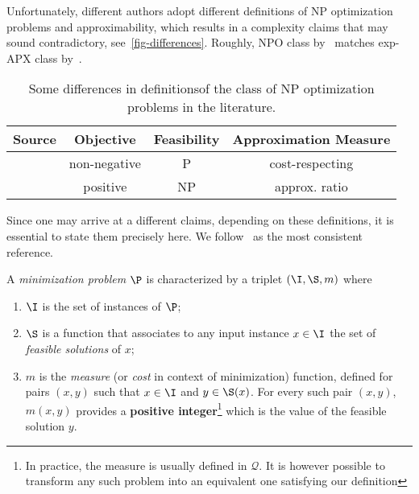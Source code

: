 Unfortunately, different authors adopt different definitions of NP optimization problems and approximability, which results in a complexity claims that may sound contradictory, see~\autoref{fig-differences}. Roughly, NPO class by~\citet{Orponen90onapproximation} matches exp-APX class by~\citet{approx99}.
\begin{table}[tb]
\centering
\setlength{\tabcolsep}{2pt}
\begin{tabular}{|c|ccc|}
\hline
Source & Objective & Feasibility & Approximation Measure \\
\hline
\cite{Orponen90onapproximation} & non-negative & P &  cost-respecting\\
\cite{approx99} & positive & NP &  approx. ratio\\
\hline
\end{tabular}
\caption{Some differences in definitions\label{fig-differences} of the class of NP optimization problems in the literature.}
\end{table}
Since one may arrive at a different claims, depending on these definitions, it is essential to state them precisely here. We follow~\citet{approx99} as the most consistent reference.
%
\begin{definition}A {\em minimization problem} $\P$ is characterized by a triplet $(\I,\S,m)$ where
\begin{enumerate}
\item $\I$ is the set of instances of $\P$;
\item $\S$ is a function that associates to any input instance $x\in\I$ the set of {\em feasible solutions} of $x$;
\item $m$ is the {\em measure} (or {\em cost} in context of minimization) function, defined for pairs $(x,y)$ such that $x\in\I$ and $y\in\S(x)$. For every such pair $(x,y)$, $m(x,y)$ provides a {\bf positive integer}\footnote{In practice, the measure is usually defined in $\mathcal{Q}$. It is however possible to transform any such problem into an equivalent one satisfying our definition} which is the value of the feasible solution $y$. 
\end{enumerate}
\end{definition}
